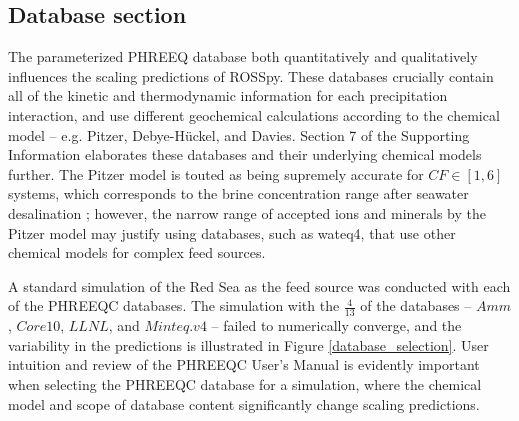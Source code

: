 \documentclass[journal=ACSES&TWater,manuscript=article]{achemso}
\begin{document}
\subsection{Database section}
The parameterized PHREEQ database both quantitatively and qualitatively influences the scaling predictions of ROSSpy. These databases crucially contain all of the kinetic and thermodynamic information for each precipitation interaction, and use different geochemical calculations according to the chemical model -- e.g. Pitzer, Debye-H\"uckel, and Davies. Section 7 of the Supporting Information elaborates these databases and their underlying chemical models further. The Pitzer model \cite{Pitzer1973ThermodynamicsEquations,Pitzer1974ThermodynamicsElectrolytes} is touted as being supremely accurate for $CF \in [1,6]$ systems, which corresponds to the brine concentration range after seawater desalination \cite{VandeLisdonk2001PredictionSystems,Sheikholeslami2004AssessmentUnits,Mohammad2007PredictionMembranes}; however, the narrow range of accepted ions and minerals by the Pitzer model may justify using databases, such as wateq4, that use other chemical models for complex feed sources. 

A standard simulation of the Red Sea as the feed source was conducted with each of the PHREEQC databases. The simulation with the $\frac{4}{13}$ of the databases -- $Amm$, $Core10$, $LLNL$, and $Minteq.v4$ -- failed to numerically converge, and the variability in the predictions is illustrated in Figure \ref{database_selection}. User intuition and review of the PHREEQC User's Manual is evidently important when selecting the PHREEQC database for a simulation, where the chemical model and scope of database content significantly change scaling predictions.
\end{document}
